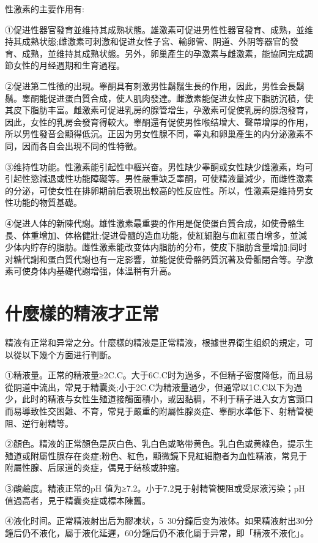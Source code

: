 \documentclass[12pt,UTF8]{ctexbook}
\begin{document}
性激素的主要作用有:

①促进性器官發育並维持其成熟状態。雄激素可促进男性性器官發育、成熟，並维持其成熟状態;雌激素可刺激和促进女性子宮、輸卵管、阴道、外阴等器官的發育、成熟，並维持其成熟状態。另外，卵巢產生的孕激素与雌激素，能協同完成調節女性的月经週期和生育過程。

②促进第二性徵的出現。睾酮具有刺激男性鬍鬚生長的作用，因此，男性会長鬍鬚。睾酮能促进蛋白質合成，使人肌肉發達。雌激素能促进女性皮下脂肪沉積，使其皮下脂肪丰富。雌激素可促进乳房的腺管增生，孕激素可促使乳房的腺泡發育，因此，女性的乳房会發育得較大。睾酮還有促使男性喉结增大、聲帶增厚的作用，所以男性發音会顯得低沉。正因为男女性腺不同，睾丸和卵巢產生的内分泌激素不同，因而各自会出現不同的性特徵。

③维持性功能。性激素能引起性中樞兴奋。男性缺少睾酮或女性缺少雌激素，均可引起性慾減退或性功能障礙等。男性嚴重缺乏睾酮，可使精液量減少，而雌性激素的分泌，可使女性在排卵期前后表現出較高的性反应性。所以，性激素是维持男女性功能的物質基礎。

④促进人体的新陳代謝。雄性激素最重要的作用是促使蛋白質合成，如使骨骼生長、体重增加、体格健壯;促进骨髓的造血功能，使紅細胞与血紅蛋白增多，並減少体内貯存的脂肪。雌性激素能改变体内脂肪的分布，使皮下脂肪含量增加;同时对糖代謝和蛋白質代謝也有一定影響，並能促使骨骼鈣質沉著及骨骺閉合等。孕激素可使身体内基礎代謝增强，体溫稍有升高。

\section{什麼樣的精液才正常}

精液有正常和异常之分。什麼樣的精液是正常精液，根據世界衛生组织的規定，可以從以下幾个方面进行判斷。

①精液量。正常的精液量≥2C.C。大于6C.C时为過多，不但精子密度降低，而且易從阴道中流出，常見于精囊炎;小于2C.C为精液量過少，但通常以1C.C以下为過少，此时的精液与女性生殖道接觸面積小，或因黏稠，不利于精子进入女方宮頸口而易導致性交困難、不育，常見于嚴重的附屬性腺炎症、睾酮水準低下、射精管梗阻、逆行射精等。

②顏色。精液的正常顏色是灰白色、乳白色或略带黄色。乳白色或黄綠色，提示生殖道或附屬性腺存在炎症;粉色、紅色，顯微鏡下見紅細胞者为血性精液，常見于附屬性腺、后尿道的炎症，偶見于结核或肿瘤。

③酸鹼度。精液正常的pH 值为≥7.2。小于7.2見于射精管梗阻或受尿液污染；pH值過高者，見于精囊炎症或標本陳舊。

④液化时间。正常精液射出后为膠凍状，5~30分鐘后变为液体。如果精液射出30分鐘后仍不液化，屬于液化延遲，60分鐘后仍不液化屬于异常，即「精液不液化」。
\end{document}
